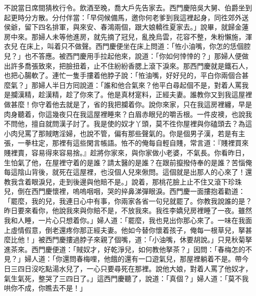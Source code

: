 不說當日席間猜枚行令。飲酒至晚，喬大戶先告家去。西門慶陪吳大舅、伯爵坐到起更時分方散。分付伴當：「早伺候備馬，邀你何老爹到我這裡起身，同徃郊外送侯爺，留下四名排軍，與來安、春鴻兩個，跟大娘轎徃夏家去。」說畢，就歸金蓮房中來。那婦人未等他進房，就先摘了冠兒，亂挽烏雲，花容不整，朱粉懶施，渾衣兒𢱉在床上，叫着只不做聲。西門慶便坐在床上問道：「恠小油嘴，你怎的恁個腔兒？」也不答應。被西門慶用手拉起他來，說道：「你如何悻悻的？」那婦人便做出許多喬張致來，把臉扭着，止不住紛紛香腮上滾下淚來。那西門慶就是鐵石人，也把心腸軟了。{}連忙一隻手摟着他脖子說：「恠油嘴，好好兒的，平白你兩個合甚麼氣？」那婦人半日方囘說道：「誰和他合氣來？他平白尋起個不是，對着人罵我是攔漢精，趁漢精，{}趁了你來了。他是真材寔料，正經夫妻。誰教你又到我這屋裡做甚麼！你守着他去就是了，省的我把攔着你。說你來家，只在我這房裡纏，早是肉身聽着，你這幾夜只在我這屋裡睡來？白眉赤眼兒的嚼舌根。一件皮襖，也說我不問他，擅自就問漢子討了。我是使的奴才丫頭，莫不徃你屋裡與你磕頭去？為這小肉兒罵了那賊瞎淫婦，也說不管，偏有那些聲氣的。你是個男子漢，若是有主張，一拳柱定，那裡有這些閑言帳語。恠不的俺每自輕自賤，常言道：『賤裡買來賤裡賣，容易得來容易捨。』趁將你家來，與你家做小老婆，不氣長。你看昨日，生怕氣了他，在屋裡守着的是誰？請太醫的是誰？在跟前攛撥侍奉的是誰？苦惱俺每這陰山背後，就死在這屋裡，也沒個人兒來偢問。這個就是出那人的心來了！還教我含着眼淚兒，走到後邊與他賠不是。」{}說着，那桃花臉上止不住又滾下珍珠兒，倒在西門慶懷裡，嗚嗚咽咽，哭的捽鼻涕彈眼淚。西門慶一面摟抱着勸道：「罷麼，我的兒，我連日心中有事，你兩家各省一句兒就罷了。你教我說誰的是？{}昨日要來看你，他說我來與你賠不是，不放我來。我徃李嬌兒房裡睡了一夜。雖然我和人睡，一片心只想着你。」婦人道：「罷麼，我也見出你那心來了。一味在我面上虛情假意，倒老還疼你那正經夫妻。他如今替你懷着孩子，俺每一根草兒，拏甚麼比他！」被西門慶摟過脖子來親了個嘴，道：「小油嘴，休要胡說。」只見秋菊拏進茶來。西門慶便道：「賊奴才，好乾淨兒，如何教他拏茶？」因問：「春梅怎的不見？」婦人道：「你還問春梅哩，他餓的還有一口遊氣兒，那屋裡躺着不是。帶今日三四日沒吃點湯水兒了，一心只要尋死在那裡。說他大娘，對着人罵了他奴才，氣生氣死，整哭了三四日了。」這西門慶聽了，說道：「真個？」婦人道：「莫不我哄你不成，你瞧去不是！」

